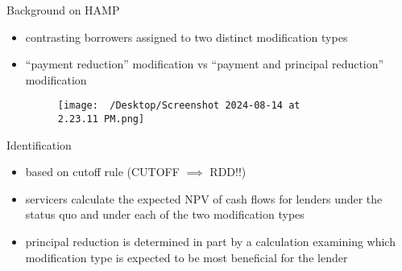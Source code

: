\begin{frame}{Background on HAMP}
\begin{itemize}
        \item contrasting borrowers assigned to two distinct modification types
        \item “payment reduction” modification vs “payment and principal reduction” modification
        \begin{figure}
        \centering
        \texttt{[image: ~/Desktop/Screenshot 2024-08-14 at 2.23.11 PM.png]}
        \caption{}
        \label{fig:photo}
    \end{figure}
\end{itemize}
\end{frame}

\begin{frame}{Identification}
\begin{itemize}
        \item based on cutoff rule (CUTOFF $\implies$ RDD!!)
        \item servicers calculate the expected NPV of cash flows for lenders under the status quo and under each of the two modification types
        \item principal reduction is determined in part by a calculation examining which modification type is expected to be most beneficial for the lender
        \begin{figure}
        \centering
        \hspace{1cm}
    \end{figure}
\end{itemize}
\end{frame}

